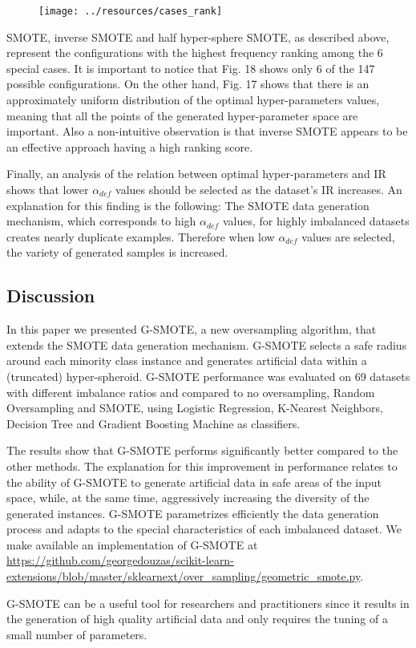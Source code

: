 \documentclass[parskip=full]{scrartcl}
\begin{document}
\begin{figure}[H]
	\centering
	\texttt{[image: ../resources/cases\_rank]}
\end{figure}

SMOTE, inverse SMOTE and half hyper-sphere SMOTE, as described above, represent the configurations with the highest frequency ranking among the 6 special cases. It is important to notice that Fig. 18 shows only  6 of the 147 possible configurations. On the other hand, Fig. 17 shows that there is an approximately uniform distribution of the optimal hyper-parameters values, meaning that all the points of the generated hyper-parameter space are important. Also a non-intuitive observation is that inverse SMOTE appears to be an effective approach having a high ranking score.

Finally, an analysis of the relation between optimal hyper-parameters and IR shows that lower \( \alpha_{def} \) values should be selected as the dataset's IR increases. An explanation for this finding is the following: The SMOTE data generation mechanism, which corresponds to high \( \alpha_{def} \) values, for highly imbalanced datasets   creates nearly duplicate examples.  Therefore when low \( \alpha_{def} \) values are selected, the variety of generated samples is increased.

\subsection{Discussion}

In this paper we presented G-SMOTE, a new oversampling algorithm, that extends the SMOTE data generation mechanism. G-SMOTE selects a safe radius around each minority class instance and generates artificial data within a (truncated) hyper-spheroid. G-SMOTE performance was evaluated on 69 datasets with different imbalance ratios and compared to no oversampling, Random Oversampling and SMOTE, using Logistic Regression, K-Nearest Neighbors, Decision Tree and Gradient Boosting Machine as classifiers.

The results show that G-SMOTE performs significantly better compared to the other methods. The explanation for this improvement in performance relates to the ability of G-SMOTE to generate artificial data in safe areas of the input space, while, at the same time, aggressively increasing the diversity of the generated instances. G-SMOTE parametrizes efficiently the data generation process and adapts to the special characteristics of each imbalanced dataset. We make available an implementation of G-SMOTE at \url{https://github.com/georgedouzas/scikit-learn-extensions/blob/master/sklearnext/over_sampling/geometric_smote.py}.

G-SMOTE can be a useful tool for researchers and practitioners since it results in the generation of high quality artificial data and only requires the tuning of a small number of parameters.



\end{document}
